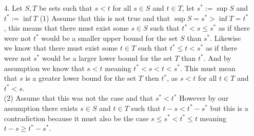 \documentclass[12pt]{amsart}
\begin{document}
\begin{itemize}
   \item[4.] Let $S,T$ be sets such that $s<t$ for all $s\in S$ and $t\in T$, let $s^*:=\sup S$ and $t^*:=\inf T$
      (1) Assume that this is not true and that $\sup S=s^*> \inf T=t^*$, 
      this means that there must exist some $s\in S$ such that $t^*<s\leq s^*$ as if there were not $t^*$ would be a
      smaller upper bound for the set $S$ than $s^*$. Likewise we know that there must exist 
      some $t\in T$ such that $t^*\leq t< s^*$ as if there were not $s^*$ would be a
      larger lower bound for the set $T$ than $t^*$. And by assumption we know that $s<t$ meaning 
      $t^*<s<t<s^*$. This must mean that $s$ is a greater lower bound for the set $T$ then $t^*$, as $s<t$ 
      for all $t\in T$ and $t^*<s$.\\
      (2) Assume that this was not the case and that $s^*<t^*$ However by our 
      assumption there exists $s\in S$ and $t\in T$ such that $t-s<t^*-s^*$ but this is a
      contradiction because it must also be the case $s\leq s^*<t^*\leq t$ meaning $t-s\geq t^*-s^*$.

\end{itemize}
\end{document}

